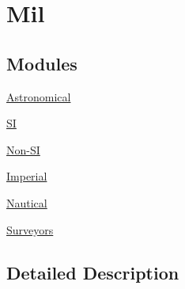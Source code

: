 \hypertarget{group___e_g_x_math-_conversions-_length_conversions-_imperial-_mil}{}\section{Mil}
\label{group___e_g_x_math-_conversions-_length_conversions-_imperial-_mil}
\subsection*{Modules}
\begin{DoxyCompactItemize}
\item 
\mbox{\hyperlink{group___e_g_x_math-_conversions-_length_conversions-_imperial-_mil-_astronomical}{Astronomical}}
\item 
\mbox{\hyperlink{group___e_g_x_math-_conversions-_length_conversions-_imperial-_mil-_s_i}{SI}}
\item 
\mbox{\hyperlink{group___e_g_x_math-_conversions-_length_conversions-_imperial-_mil-_non-_s_i}{Non-\/\+SI}}
\item 
\mbox{\hyperlink{group___e_g_x_math-_conversions-_length_conversions-_imperial-_mil-_imperial}{Imperial}}
\item 
\mbox{\hyperlink{group___e_g_x_math-_conversions-_length_conversions-_imperial-_mil-_nautical}{Nautical}}
\item 
\mbox{\hyperlink{group___e_g_x_math-_conversions-_length_conversions-_imperial-_mil-_surveyors}{Surveyors}}
\end{DoxyCompactItemize}


\subsection{Detailed Description}
